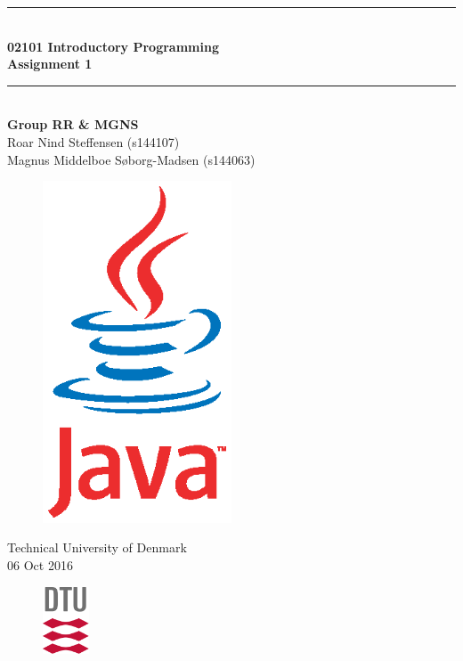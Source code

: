 \begin{titlepage}
\centering
\parindent=0pt
\newcommand{\HRule}{\rule{\textwidth}{1mm}}
 \HRule\\[1cm]\huge\textbf
{02101 Introductory Programming \\Assignment 1}\\[0.1cm]
\HRule\\[3cm]\vspace{-1 cm} \textbf{\Large{Group RR \& MGNS}}\\
\large{
Roar Nind Steffensen (s144107)\\
Magnus Middelboe Søborg-Madsen (s144063)}

\vspace{1 cm}

\begin{figure}[H]
\centering
\includegraphics[width=0.5\textwidth]{java.eps}
\label{fig:front}
\end{figure}

 \normalsize %
Technical University of Denmark\\
06 Oct 2016
\vspace{0.5cm}
\begin{figure}[h]
    \centering
    \includegraphics[height=2cm]{DTUlogo.png}
\end{figure}
\end{titlepage}